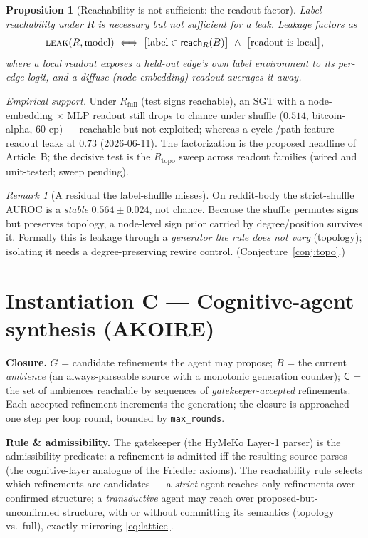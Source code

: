 \documentclass[11pt,a4paper]{article}
\theoremstyle{definition}
\theoremstyle{plain}
\newtheorem{proposition}{Proposition}
\theoremstyle{remark}
\newtheorem{remark}{Remark}
\newcommand{\Cl}{\mathsf{C}}
\newcommand{\Rtopo}{R_{\mathrm{topo}}}
\newcommand{\Rfull}{R_{\mathrm{full}}}
\newcommand{\reach}{\mathsf{reach}}
\begin{document}
\begin{proposition}[Reachability is not sufficient: the readout factor]
\label{prop:readout}
Label reachability under $R$ is necessary but not sufficient for a leak.
Leakage factors as
\[
  \textsc{leak}(R,\text{model}) \;\Longleftrightarrow\;
  \big[\text{label}\in\reach_R(B)\big]\ \wedge\ \big[\text{readout is local}\big],
\]
where a \emph{local} readout exposes a held-out edge's own label environment to
its per-edge logit, and a \emph{diffuse} (node-embedding) readout averages it
away.
\end{proposition}
\emph{Empirical support.} Under $\Rfull$ (test signs reachable), an SGT with a
node-embedding $\times$ MLP readout still drops to chance under shuffle
($0.514$, bitcoin-alpha, 60 ep) --- reachable but not exploited; whereas a
cycle-/path-feature readout leaks at $0.73$ (2026-06-11). The factorization is
the proposed headline of Article~B; the decisive test is the $\Rtopo$ sweep
across readout families (wired and unit-tested; sweep pending).

\begin{remark}[A residual the label-shuffle misses]
On reddit-body the strict-shuffle AUROC is a \emph{stable} $0.564\pm0.024$, not
chance. Because the shuffle permutes signs but preserves topology, a node-level
sign prior carried by degree/position survives it. Formally this is leakage
through a \emph{generator the rule does not vary} (topology); isolating it needs a
degree-preserving rewire control. (Conjecture~\ref{conj:topo}.)
\end{remark}

\section{Instantiation C --- Cognitive-agent synthesis (AKOIRE)}
\label{sec:agent}

\textbf{Closure.} $G$ = candidate refinements the agent may propose;
$B$ = the current \emph{ambience} (an always-parseable source with a monotonic
generation counter); $\Cl$ = the set of ambiences reachable by sequences of
\emph{gatekeeper-accepted} refinements. Each accepted refinement increments the
generation; the closure is approached one step per loop round, bounded by
\texttt{max\_rounds}.

\textbf{Rule \& admissibility.} The gatekeeper (the HyMeKo Layer-1 parser) is the
admissibility predicate: a refinement is admitted iff the resulting source parses
(the cognitive-layer analogue of the Friedler axioms). The reachability rule
selects which refinements are candidates --- a \emph{strict} agent reaches only
refinements over confirmed structure; a \emph{transductive} agent may reach over
proposed-but-unconfirmed structure, with or without committing its semantics
(topology vs.\ full), exactly mirroring \eqref{eq:lattice}.
\end{document}
